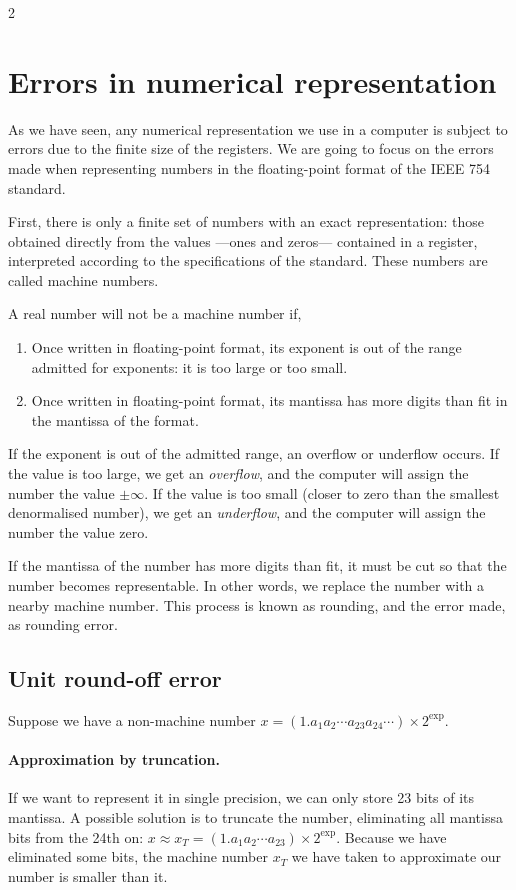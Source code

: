\begin{paracol}{2}
\section{Errors in numerical representation}
As we have seen, any numerical representation we use in a computer is subject to errors due to the finite size of the registers. We are going to focus on the errors made when representing numbers in the floating-point format of the IEEE 754 standard.

First, there is only a finite set of numbers with an exact representation: those obtained directly from the values ---ones and zeros--- contained in a register, interpreted according to the specifications of the standard. These numbers are called machine numbers.

A real number will not be a machine number if,
\begin{enumerate}
	\item Once written in floating-point format, its exponent is out of the range admitted for exponents: it is too large or too small.
	\item Once written in floating-point format, its mantissa has more digits than fit in the mantissa of the format.
\end{enumerate}
If the exponent is out of the admitted range, an overflow or underflow occurs. If the value is too large, we get an \emph{overflow}, and the computer will assign the number the value $\pm \infty$. If the value is too small (closer to zero than the smallest denormalised number), we get an \emph{underflow}, and the computer will assign the number the value zero.

If the mantissa of the number has more digits than fit, it must be cut so that the number becomes representable. In other words, we replace the number with a nearby machine number. This process is known as rounding, and the error made, as rounding error.

\subsection{Unit round-off error}
Suppose we have a non-machine number $x=(1.a_1a_2\cdots a_{23}a_{24}\cdots)\times2^{\text{exp}}$.

\paragraph{Approximation by truncation.} If we want to represent it in single precision, we can only store 23 bits of its mantissa. A possible solution is to truncate the number, eliminating all mantissa bits from the 24th on: $x\approx x_T=  (1.a_1a_2\cdots a_{23})\times2^{\text{exp}}$. Because we have eliminated some bits, the machine number $x_T$ we have taken to approximate our number is smaller than it.


\end{paracol}
